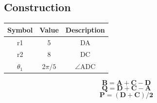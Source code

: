 \documentclass[journal,12pt,twocolumn]{IEEEtran}
\let\vec\mathbf
\let\vec\mathbf
\begin{document}
\begin{tableofcontents}
\section{Construction}
\begin{center}
\begin{tabular}{|c|c|c|}
\hline
\textbf{Symbol}&{Value}&{Description}\\
\hline
r1&5&DA\\
\hline
r2&8&DC\\
\hline
${\theta}_1$& 2$\pi/5$&$ \angle $ADC\\ 
\hline
\end{tabular}
\end{center}
\begin{center}
\begin{equation}
\vec{B}= \vec{A}+\vec{C}-\vec{D}
\end{equation}
\begin{equation}
\vec{Q}= \vec{D}+\vec{C}-\vec{A}
\end{equation}
\begin{equation}
\vec{P}= \vec{(D+C)/2}
\end{equation}
\end{center}

\end{tableofcontents}
\end{document}
